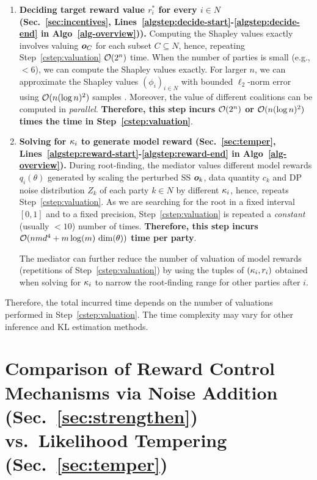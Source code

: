 \documentclass{article}
\theoremstyle{plain}
\theoremstyle{definition}
\theoremstyle{remark}
\begin{document}
\begin{enumerate}[resume=compute]
    \item \label{cstep:shapley} \textbf{Deciding target reward value $r^*_i$ for every $i \in N$  (Sec.~\ref{sec:incentives}, Lines~\ref{algstep:decide-start}-\ref{algstep:decide-end} in Algo~\ref{alg-overview})).} Computing the Shapley values exactly involves valuing ${\bm{o}}_C$ for each subset $C \subseteq N$, hence, repeating Step~\ref{cstep:valuation} ${\mathcal{O}}(2^n)$ time.
    When the number of parties is small (e.g., $<6$), we can compute the Shapley values exactly.
    For larger $n$, we can approximate the Shapley values $(\phi_i)_{i \in N}$ with bounded $\ell_2$-norm error using ${\mathcal{O}}(n (\log n)^2)$ samples \cite{jia2019towards,wang2023estimation-note}. Moreover, the value of different coalitions can be computed in \emph{parallel}.  \textbf{Therefore, this step incurs ${\mathcal{O}}(2^n)$ or ${\mathcal{O}}(n (\log n)^2)$ times the time in Step~\ref{cstep:valuation}}.
    \item \textbf{Solving for ${\kappa_i}$ to generate model reward (Sec.~\ref{sec:temper}, Lines~\ref{algstep:reward-start}-\ref{algstep:reward-end} in Algo~\ref{alg-overview}).} 
    During root-finding, the mediator values different model rewards $q_i(\theta)$ generated by scaling the perturbed SS  ${\bm{o}}_k$, data quantity $c_k$ and DP noise distribution $Z_k$ of each party $k \in N$ by different ${\kappa_i}$, hence, repeats Step~\ref{cstep:valuation}.
    As we are searching for the root in a fixed interval $[0,1]$ and to a fixed precision, Step~\ref{cstep:valuation} is repeated a \emph{constant} (usually $<10$) number of times. \textbf{Therefore, this step incurs  $\gO(n m d^4 + m \log(m)\ \mathrm{dim}(\theta))$ time per party}.

    The mediator can further reduce the number of valuation of model rewards (repetitions of Step~\ref{cstep:valuation}) by using the tuples of $({\kappa_i}, r_i)$ obtained when solving for ${\kappa_i}$ to narrow the root-finding range for other parties after $i$.
\end{enumerate} 

\noindent Therefore, the total incurred time depends on the number of valuations performed in Step~\ref{cstep:valuation}.
The time complexity may vary for other inference and KL estimation methods.

\clearpage
    


\section{Comparison of Reward Control Mechanisms via Noise Addition (Sec.~\ref{sec:strengthen}) vs.~Likelihood Tempering (Sec.~\ref{sec:temper})}\label{app:compare-reward}
\end{document}
